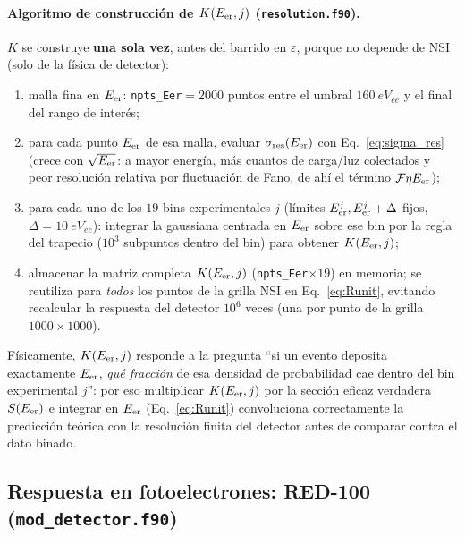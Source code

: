 \documentclass[11pt,a4paper]{article}
\newcommand{\eps}{\varepsilon}
\newcommand{\Eer}{E_{\rm er}}
\newcommand{\code}[1]{\texttt{#1}}
\begin{document}
\paragraph{Algoritmo de construcci\'on de $K(\Eer,j)$ (\code{resolution.f90}).}
$K$ se construye \textbf{una sola vez}, antes del barrido en $\eps$, porque no
depende de NSI (solo de la f\'isica de detector):
\begin{enumerate}\itemsep2pt
  \item malla fina en $\Eer$: \code{npts\_Eer}$=2000$ puntos entre el umbral
    $\SI{160}{eV_{ee}}$ y el final del rango de inter\'es;
  \item para cada punto $\Eer$ de esa malla, evaluar $\sigma_{\rm res}(\Eer)$
    con Eq.~\eqref{eq:sigma_res} (crece con $\sqrt{\Eer}$: a mayor energ\'ia, m\'as
    cuantos de carga/luz colectados y peor resoluci\'on relativa por
    fluctuaci\'on de Fano, de ah\'i el t\'ermino $\mathcal{F}\eta\Eer$);
  \item para cada uno de los $19$ bins experimentales $j$ (l\'imites
    $\Eer^{j}, \Eer^{j}+\Delta$ fijos, $\Delta=\SI{10}{eV_{ee}}$): integrar la
    gaussiana centrada en $\Eer$ sobre ese bin por la regla del trapecio
    ($10^{3}$ subpuntos dentro del bin) para obtener $K(\Eer,j)$;
  \item almacenar la matriz completa $K(\Eer,j)$ (\code{npts\_Eer}$\times19$) en
    memoria; se reutiliza para \emph{todos} los puntos de la grilla NSI en
    Eq.~\eqref{eq:Runit}, evitando recalcular la respuesta del detector
    $10^{6}$ veces (una por punto de la grilla $1000\times1000$).
\end{enumerate}
F\'isicamente, $K(\Eer,j)$ responde a la pregunta ``si un evento deposita
exactamente $\Eer$, \emph{qu\'e fracci\'on} de esa densidad de probabilidad cae
dentro del bin experimental $j$'': por eso multiplicar $K(\Eer,j)$ por la
secci\'on eficaz verdadera $S(\Eer)$ e integrar en $\Eer$
(Eq.~\eqref{eq:Runit}) convoluciona correctamente la predicci\'on te\'orica con
la resoluci\'on finita del detector antes de comparar contra el dato binado.

\subsection{Respuesta en fotoelectrones: RED-100 (\code{mod\_detector.f90})}
\label{sec:pe}
\end{document}
